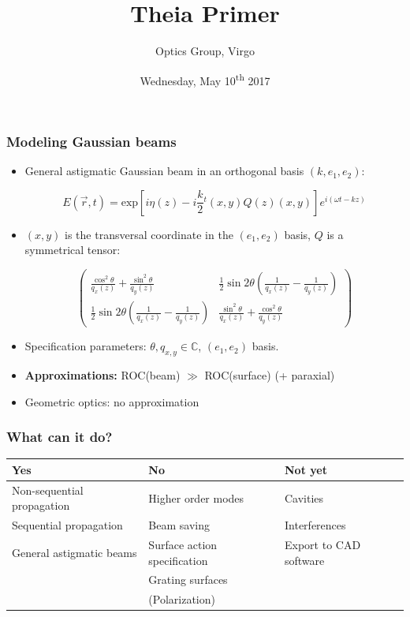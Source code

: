 \documentclass{beamer}
\title{Theia Primer}
\author{Optics Group, Virgo}
\date{Wednesday, May 10\textsuperscript{th} 2017} %
\begin{document}
\begin{frame}
\titlepage %
\end{frame}





\begin{frame}
\frametitle{Modeling Gaussian beams}
\begin{itemize}
\item General astigmatic Gaussian beam in an orthogonal basis $(k, e_1, e_2)$:

$$ E(\vec r, t) = \mathrm{exp}[ i \eta(z) -i\frac{k}{2} {}^t (x,y) Q(z) (x,y)] e^{i(\omega t - kz)} $$

\item $(x,y)$ is the transversal coordinate in the $(e_1, e_2)$ basis, $Q$ is a symmetrical tensor:

\[ \left( \begin{array}{cc}
\frac{\cos^2 \theta}{q_x(z)} + \frac{\sin^2 \theta}{q_y(z)} & \frac{1}{2} \sin2\theta \left(\frac{1}{q_x(z)}  - \frac{1}{q_y(z)}\right)\\
\frac{1}{2} \sin2\theta \left(\frac{1}{q_x(z)}  - \frac{1}{q_y(z)} \right) & \frac{\sin^2 \theta}{q_x(z)} + \frac{\cos^2 \theta}{q_y(z)} \end{array} \right)\] 

\item Specification parameters: $\theta, q_{x,y} \in \mathbb{C}$, $(e_1, e_2)$ basis.

\item \textbf{Approximations:} ROC(beam) $ \gg $ ROC(surface) (+ paraxial)

\item Geometric optics: no approximation
\end{itemize}
\end{frame}

\begin{frame}
\frametitle{What can it do?}

\begin{table}
\begin{center}
\begin{tabular}{p{3.5cm} | p{3.5cm}| p{3.5cm}}
\textbf{Yes} & \textbf{No} & \textbf{Not yet} \\ \hline
Non-sequential propagation & Higher order modes & Cavities \\
Sequential propagation & Beam saving & Interferences \\
General astigmatic beams & Surface action specification & Export to CAD software\\
 & Grating surfaces &  \\
 & (Polarization) & \\
\end{tabular}
\end{center}
\end{table}
\end{frame}
\end{document}
